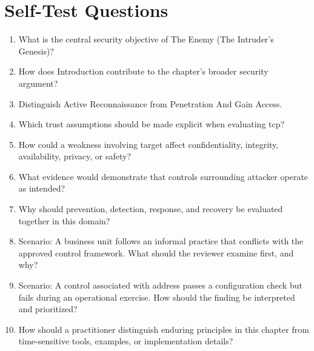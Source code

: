 \documentclass[11pt]{article}
\begin{document}
\section*{Self-Test Questions}
\begin{enumerate}
\item What is the central security objective of The Enemy (The Intruder's Genesis)?
\item How does Introduction contribute to the chapter's broader security argument?
\item Distinguish Active Reconnaissance from Penetration And Gain Access.
\item Which trust assumptions should be made explicit when evaluating tcp?
\item How could a weakness involving target affect confidentiality, integrity, availability, privacy, or safety?
\item What evidence would demonstrate that controls surrounding attacker operate as intended?
\item Why should prevention, detection, response, and recovery be evaluated together in this domain?
\item Scenario: A business unit follows an informal practice that conflicts with the approved control framework. What should the reviewer examine first, and why?
\item Scenario: A control associated with address passes a configuration check but fails during an operational exercise. How should the finding be interpreted and prioritized?
\item How should a practitioner distinguish enduring principles in this chapter from time-sensitive tools, examples, or implementation details?
\end{enumerate}
\end{document}
